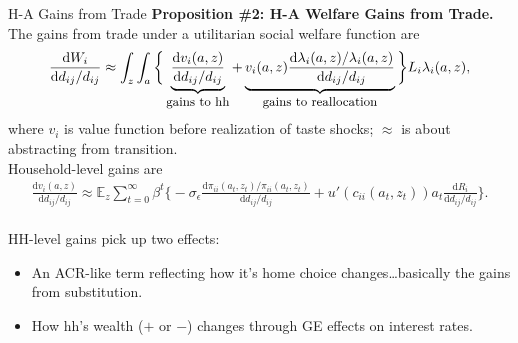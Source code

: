 \documentclass[9pt,pdftex,aspectratio=1610]{beamer}
\theoremstyle{definition}
\begin{document}
\begin{frame}[t]{H-A Gains from Trade}
\smallskip
\textbf{Proposition \#2: H-A Welfare Gains from Trade.} The gains from trade under a utilitarian social welfare function are
\begin{align*}
\frac{\mathrm{d} W_{i}}{\mathrm{d} d_{ij} / d_{ij}} \approx \int_{z} \int_{a}  \bigg \{ \underbrace{\frac{\mathrm{d} v_i(a, z)}{\mathrm{d} d_{ij} / d_{ij}}}_{\small \mbox{gains to hh}}  + \underbrace{v_{i}(a,z) \frac{\mathrm{d} \lambda_{i}(a,z)/ \lambda_{i}(a,z)}{\mathrm{d} d_{ij} / d_{ij}}}_{\small \mbox{gains to reallocation}}   \bigg \} L_i \lambda_{i}(a,z),
\nonumber
\end{align*}
where $v_i$ is value function before realization of taste shocks; $\approx$ is about abstracting from transition. \\
\medskip
Household-level gains are
\begin{align*}
\frac{\mathrm{d} v_i(a, z)}{\mathrm{d} d_{ij} / d_{ij}} \approx \mathbb{E}_{z} \sum_{t = 0}^{\infty} \beta^{t} \bigg \{ -\sigma_{\epsilon} \frac{\mathrm{d} \pi_{ii}(a_{t},z_{t}) / \pi_{ii}(a_{t},z_{t})}{\mathrm{d}d_{ij} / d_{ij}} + u'(c_{ii}(a_{t},z_{t}))a_{t} \frac{\mathrm{d} R_{i}}{\mathrm{d} d_{ij} / d_{ij}} \bigg \}.
\end{align*}\\
\bigskip
\medskip
HH-level gains pick up two effects:
\begin{itemize}
\item An ACR-like term reflecting how it's home choice changes\ldots basically the gains from substitution.
\smallskip
\item How hh's wealth ($+$ or $-$) changes through GE effects on interest rates.
\end{itemize}
\end{frame}

\end{document}
